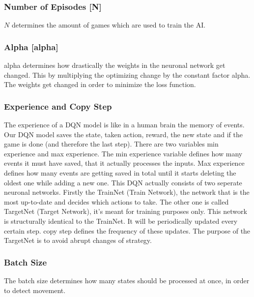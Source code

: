 \documentclass[12pt]{article}
\def\alpha{alpha}%
\def\({}%
\def\){}%
\begin{document}
\subsubsection{Number of Episodes [\(N\)]}
$N$ determines the amount of games which are used to train the \gls{AI}.

\subsubsection{Alpha [\(\alpha\)]}\label{sssec:alpha}
\Gls{alpha} determines how drastically the \glspl{weight} in the \gls{neuronal network} get changed. This by multiplying the optimizing change by the constant factor \gls{alpha}. The \glspl{weight} get changed in order to minimize the loss function.

\subsubsection{Experience and Copy Step}\label{sssec:copy_step}
The \gls{experience} of a \gls{DQN} model is like in a human brain the \gls{memory} of events. Our \gls{DQN} model saves the \gls{state}, taken action, \gls{reward}, the new \gls{state} and if the game is done (and therefore the last step). There are two variables \gls{min experience} and \gls{max experience}. The min \gls{experience} variable defines how many events it must have saved, that it actually processes the \glspl{input}. Max \gls{experience} defines how many events are getting saved in total until it starts deleting the oldest one while adding a new one. 
This \gls{DQN} actually consists of two seperate \glspl{neuronal network}. Firstly the \gls{TrainNet} (Train Network), the network that is the most up-to-date and decides which actions to take. The other one is called  \gls{TargetNet} (Target Network), it’s meant for training purposes only. This network is structurally identical to the  \gls{TrainNet}. It will be periodically updated every certain step. \Gls{copy step} defines the frequency of these updates. The purpose of the  \gls{TargetNet} is to avoid abrupt changes of strategy. 

\subsubsection{Batch Size}
The batch size determines how many \glspl{state} should be processed at once, in order to detect movement. 
\end{document}
